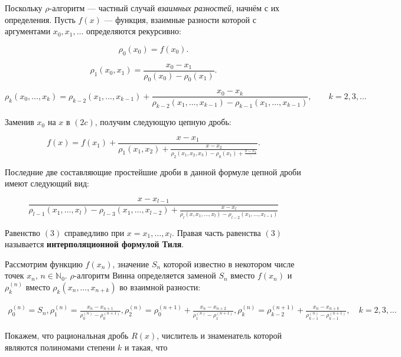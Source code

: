 \documentclass[14pt, a4paper]{extarticle}
\theoremstyle{definition}
\theoremstyle{remark}
\begin{document}
Поскольку \(\rho\)-алгоритм — частный случай \emph{взаимных разностей},
начнём с их определения. Пусть \(f(x)\) — функция, взаимные разности которой
с аргументами \(x_{0}, x_{1}, \ldots\) определяются рекурсивно:

\[
\rho_{0}(x_{0}) = f(x_{0}).
\]

\[
\rho_{1}(x_{0},x_{1})
= \frac{x_{0}-x_{1}}{\rho_{0}(x_{0}) - \rho_{0}(x_{1})}.
\]

\[
\rho_{k}(x_{0},\ldots,x_{k})
=
\rho_{k-2}(x_{1},\ldots,x_{k-1})
+
\frac{x_{0}-x_{k}}{\rho_{k-2}(x_{1},\ldots,x_{k-1}) - \rho_{k-1}(x_{1}, \ldots,x_{k-1})},
\qquad k = 2,3,\ldots
\tag{2c}
\]

Заменив \(x_{0}\) на \(x\) в \((2c)\), получим следующую цепную дробь:

\[
f(x) =
f(x_{1})
+ \frac{x-x_{1}}{\rho_{1}(x_{1},x_{2}) +
\frac{x-x_{2}}{\rho_{2}(x_{1},x_{2},x_{3}) - \rho_{0}(x_{1}) +
\frac{x-x_{3}}{\ddots}}}.
\]

Последние две составляющие простейшие дроби в данной формуле цепной дроби имеют следующий вид:

\[
\frac{
  x - x_{l-1}
}{
  \rho_{l-1}(x_{1},\ldots,x_{l}) - \rho_{l-3}(x_{1},\ldots,x_{l-2}) 
  + 
  \frac{x - x_{l}}{
    \rho_{l}(x,x_{1},\ldots,x_{l}) - \rho_{l-2}(x_{1},\ldots,x_{l-1})
  }
}
\]

Равенство \((3)\) справедливо при \(x = x_{1},\ldots,x_{l}\).  
Правая часть равенства \((3)\) называется \textbf{интерполяционной формулой Тиля}.

Рассмотрим функцию \(f(x_{n})\), значение \(S_{n}\) которой известно в некотором числе точек \(x_{n}\), \(n \in \mathbb{N}_{0}\). $\rho$-алгоритм Винна определяется заменой \(S_{n}\) вместо \(f(x_{n})\) и \(\rho_{k}^{(n)}\) вместо \(\rho_{k}(x_{n},\ldots,x_{n+k})\) во взаимной разности:

\begin{subequations}
\begin{align}
\rho_{0}^{(n)} = S_{n},

\rho_{1}^{(n)} = \frac{x_{n} - x_{n+1}}{\rho_{0}^{(n)} - \rho_{0}^{(n+1)}}, 


\rho_{2}^{(n)} = \rho_{0}^{(n+1)} + \frac{x_{n} - x_{n+2}}{\rho_{1}^{(n)} - \rho_{1}^{(n+1)}},


\rho_{k}^{(n)} = \rho_{k-2}^{(n+1)} + \frac{x_{n} - x_{n+k}}{\rho_{k-1}^{(n)} - \rho_{k-1}^{(n+1)}}, \quad k = 2,3,\ldots
\end{align}
\end{subequations}


Покажем, что рациональная дробь \(R(x)\), числитель и знаменатель которой являются полиномами степени \(k\) и такая, что
\end{document}
